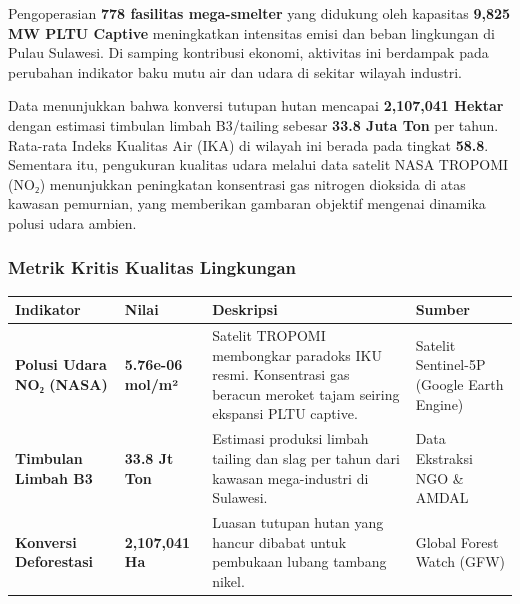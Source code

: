 \documentclass[
]{article}
\newcounter{none} %
\begin{document}
Pengoperasian \textbf{778 fasilitas mega-smelter} yang didukung oleh
kapasitas \textbf{9,825 MW PLTU Captive} meningkatkan intensitas emisi
dan beban lingkungan di Pulau Sulawesi. Di samping kontribusi ekonomi,
aktivitas ini berdampak pada perubahan indikator baku mutu air dan udara
di sekitar wilayah industri.

Data menunjukkan bahwa konversi tutupan hutan mencapai \textbf{2,107,041
Hektar} dengan estimasi timbulan limbah B3/tailing sebesar \textbf{33.8
Juta Ton} per tahun. Rata-rata Indeks Kualitas Air (IKA) di wilayah ini
berada pada tingkat \textbf{58.8}. Sementara itu, pengukuran kualitas
udara melalui data satelit NASA TROPOMI (NO₂) menunjukkan peningkatan
konsentrasi gas nitrogen dioksida di atas kawasan pemurnian, yang
memberikan gambaran objektif mengenai dinamika polusi udara ambien.

\subsubsection{Metrik Kritis Kualitas
Lingkungan}\label{metrik-kritis-kualitas-lingkungan}

{\def\LTcaptype{none} %
\begin{longtable}[]{@{}
  >{\raggedright\arraybackslash}p{}
  >{\raggedright\arraybackslash}p{}
  >{\raggedright\arraybackslash}p{}
  >{\raggedright\arraybackslash}p{}@{}}
\toprule\noalign{}
\begin{minipage}[b]{\linewidth}\raggedright
Indikator
\end{minipage} & \begin{minipage}[b]{\linewidth}\raggedright
Nilai
\end{minipage} & \begin{minipage}[b]{\linewidth}\raggedright
Deskripsi
\end{minipage} & \begin{minipage}[b]{\linewidth}\raggedright
Sumber
\end{minipage} \\
\midrule\noalign{}
\endhead
\bottomrule\noalign{}
\endlastfoot
\textbf{Polusi Udara NO₂ (NASA)} & \textbf{5.76e-06 mol/m²} & Satelit
TROPOMI membongkar paradoks IKU resmi. Konsentrasi gas beracun meroket
tajam seiring ekspansi PLTU captive. & Satelit Sentinel-5P (Google Earth
Engine) \\
\textbf{Timbulan Limbah B3} & \textbf{33.8 Jt Ton} & Estimasi produksi
limbah tailing dan slag per tahun dari kawasan mega-industri di
Sulawesi. & Data Ekstraksi NGO \& AMDAL \\
\textbf{Konversi Deforestasi} & \textbf{2,107,041 Ha} & Luasan tutupan
hutan yang hancur dibabat untuk pembukaan lubang tambang nikel. & Global
Forest Watch (GFW) \\
\end{longtable}
}
\end{document}

